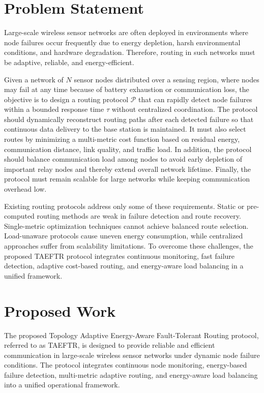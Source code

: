 \documentclass[a4paper,fleqn]{cas-dc}
\numberwithin{equation}{section}
\begin{document}
\section{Problem Statement}
 Large-scale wireless sensor networks are often deployed in environments where node failures occur frequently due to energy depletion, harsh environmental conditions, and hardware degradation. Therefore, routing in such networks must be adaptive, reliable, and energy-efficient.  

Given a network of $N$ sensor nodes distributed over a sensing region, where nodes may fail at any time because of battery exhaustion or communication loss, the objective is to design a routing protocol $\mathcal{P}$ that can rapidly detect node failures within a bounded response time $\tau$ without centralized coordination. The protocol should dynamically reconstruct routing paths after each detected failure so that continuous data delivery to the base station is maintained. It must also select routes by minimizing a multi-metric cost function based on residual energy, communication distance, link quality, and traffic load. In addition, the protocol should balance communication load among nodes to avoid early depletion of important relay nodes and thereby extend overall network lifetime. Finally, the protocol must remain scalable for large networks while keeping communication overhead low.  

Existing routing protocols address only some of these requirements. Static or pre-computed routing methods are weak in failure detection and route recovery. Single-metric optimization techniques cannot achieve balanced route selection. Load-unaware protocols cause uneven energy consumption, while centralized approaches suffer from scalability limitations. To overcome these challenges, the proposed TAEFTR protocol integrates continuous monitoring, fast failure detection, adaptive cost-based routing, and energy-aware load balancing in a unified framework.


\section{Proposed Work}
The proposed Topology Adaptive Energy-Aware Fault-Tolerant Routing protocol, referred to as TAEFTR, is designed to provide reliable and efficient communication in large-scale wireless sensor networks under dynamic node failure conditions. The protocol integrates continuous node monitoring, energy-based failure detection, multi-metric adaptive routing, and energy-aware load balancing into a unified operational framework.
\end{document}
